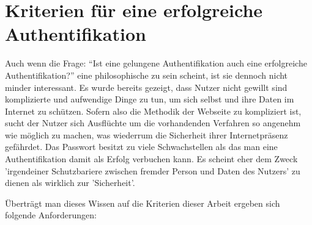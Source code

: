 \section{Kriterien für eine erfolgreiche Authentifikation}
Auch wenn die Frage: ``Ist eine gelungene Authentifikation auch eine erfolgreiche Authentifikation?'' eine philosophische zu sein scheint, ist sie dennoch nicht minder interessant. Es wurde bereits gezeigt, dass Nutzer nicht gewillt sind komplizierte und aufwendige Dinge zu tun, um sich selbst und ihre Daten im Internet zu schützen. Sofern also die Methodik der Webseite zu kompliziert ist, sucht der Nutzer sich Ausflüchte um die vorhandenden Verfahren so angenehm wie möglich zu machen, was wiederrum die Sicherheit ihrer Internetpräsenz gefährdet. Das Passwort besitzt zu viele Schwachstellen als das man eine Authentifikation damit als Erfolg verbuchen kann. Es scheint eher dem Zweck 'irgendeiner Schutzbariere zwischen fremder Person und Daten des Nutzers' zu dienen als wirklich zur 'Sicherheit'.

Überträgt man dieses Wissen auf die Kriterien dieser Arbeit ergeben sich folgende Anforderungen:

